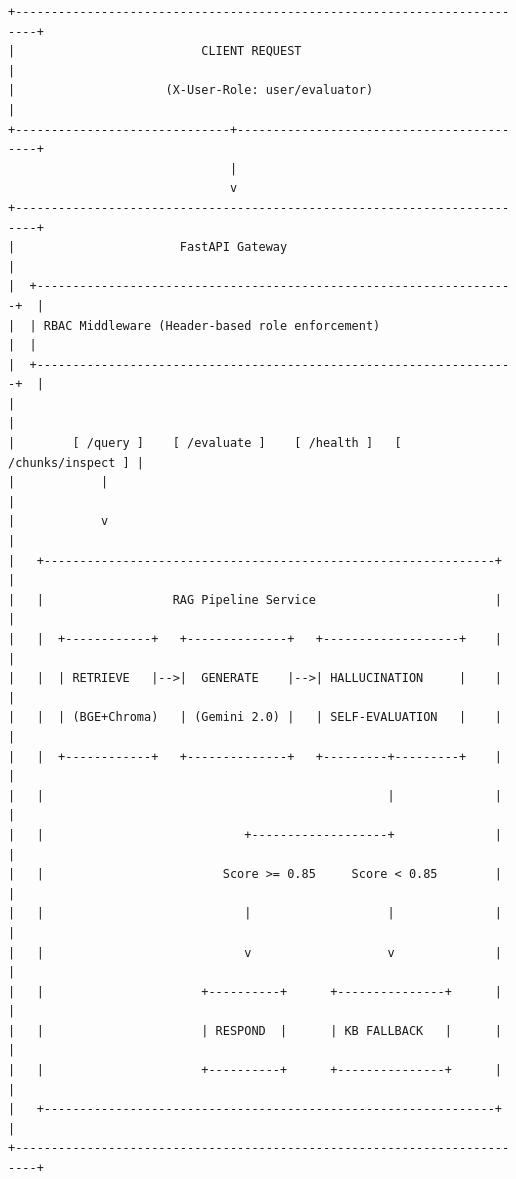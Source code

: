 \documentclass[11pt,a4paper]{article}
\begin{document}
\begin{verbatim}
+-------------------------------------------------------------------------+
|                          CLIENT REQUEST                                 |
|                     (X-User-Role: user/evaluator)                       |
+------------------------------+------------------------------------------+
                               |
                               v
+-------------------------------------------------------------------------+
|                       FastAPI Gateway                                   |
|  +-------------------------------------------------------------------+  |
|  | RBAC Middleware (Header-based role enforcement)                   |  |
|  +-------------------------------------------------------------------+  |
|                                                                         |
|        [ /query ]    [ /evaluate ]    [ /health ]   [ /chunks/inspect ] |
|            |                                                            |
|            v                                                            |
|   +---------------------------------------------------------------+     |
|   |                  RAG Pipeline Service                         |     |
|   |  +------------+   +--------------+   +-------------------+    |     |
|   |  | RETRIEVE   |-->|  GENERATE    |-->| HALLUCINATION     |    |     |
|   |  | (BGE+Chroma)   | (Gemini 2.0) |   | SELF-EVALUATION   |    |     |
|   |  +------------+   +--------------+   +---------+---------+    |     |
|   |                                                |              |     |
|   |                            +-------------------+              |     |
|   |                         Score >= 0.85     Score < 0.85        |     |
|   |                            |                   |              |     |
|   |                            v                   v              |     |
|   |                      +----------+      +---------------+      |     |
|   |                      | RESPOND  |      | KB FALLBACK   |      |     |
|   |                      +----------+      +---------------+      |     |
|   +---------------------------------------------------------------+     |
+-------------------------------------------------------------------------+
\end{verbatim}
\end{document}
